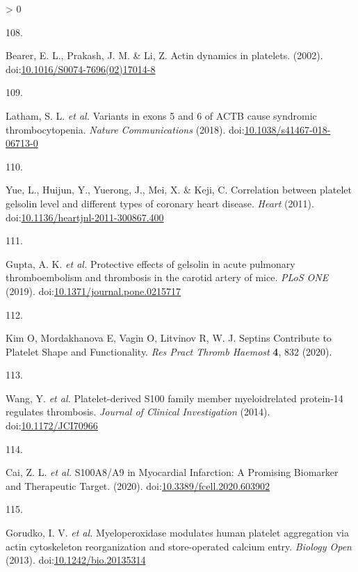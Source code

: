 \documentclass[11pt,twoside]{bristolthesis}
\newlength{\cslhangindent}
\newlength{\csllabelwidth}
\newenvironment{CSLReferences}[2] %
 {%
  \setlength{\parindent}{0pt}
  \ifodd #1 \everypar{\setlength{\hangindent}{\cslhangindent}}\ignorespaces\fi
  \ifnum #2 > 0
  \setlength{\parskip}{#2\baselineskip}
  \fi
 }%
 {}
\newcommand{\CSLLeftMargin}[1]{\parbox[t]{\csllabelwidth}{#1}}
\newcommand{\CSLRightInline}[1]{\parbox[t]{\linewidth - \csllabelwidth}{#1}\break}
\begin{document}
\begin{CSLReferences}{0}{0}
\leavevmode\hypertarget{ref-Bearer2002}{}%
\CSLLeftMargin{108. }
\CSLRightInline{Bearer, E. L., Prakash, J. M. \& Li, Z. {Actin dynamics in platelets}. (2002). doi:\href{https://doi.org/10.1016/S0074-7696(02)17014-8}{10.1016/S0074-7696(02)17014-8}}

\leavevmode\hypertarget{ref-Latham2018}{}%
\CSLLeftMargin{109. }
\CSLRightInline{Latham, S. L. \emph{et al.} {Variants in exons 5 and 6 of ACTB cause syndromic thrombocytopenia}. \emph{Nature Communications} (2018). doi:\href{https://doi.org/10.1038/s41467-018-06713-0}{10.1038/s41467-018-06713-0}}

\leavevmode\hypertarget{ref-Yue2011}{}%
\CSLLeftMargin{110. }
\CSLRightInline{Yue, L., Huijun, Y., Yuerong, J., Mei, X. \& Keji, C. {Correlation between platelet gelsolin level and different types of coronary heart disease}. \emph{Heart} (2011). doi:\href{https://doi.org/10.1136/heartjnl-2011-300867.400}{10.1136/heartjnl-2011-300867.400}}

\leavevmode\hypertarget{ref-Gupta2019}{}%
\CSLLeftMargin{111. }
\CSLRightInline{Gupta, A. K. \emph{et al.} {Protective effects of gelsolin in acute pulmonary thromboembolism and thrombosis in the carotid artery of mice}. \emph{PLoS ONE} (2019). doi:\href{https://doi.org/10.1371/journal.pone.0215717}{10.1371/journal.pone.0215717}}

\leavevmode\hypertarget{ref-Kim2020}{}%
\CSLLeftMargin{112. }
\CSLRightInline{Kim O, Mordakhanova E, Vagin O, Litvinov R, W. J. {Septins Contribute to Platelet Shape and Functionality}. \emph{Res Pract Thromb Haemost} \textbf{4}, 832 (2020).}

\leavevmode\hypertarget{ref-Wang2014a}{}%
\CSLLeftMargin{113. }
\CSLRightInline{Wang, Y. \emph{et al.} {Platelet-derived S100 family member myeloidrelated protein-14 regulates thrombosis}. \emph{Journal of Clinical Investigation} (2014). doi:\href{https://doi.org/10.1172/JCI70966}{10.1172/JCI70966}}

\leavevmode\hypertarget{ref-Cai2020}{}%
\CSLLeftMargin{114. }
\CSLRightInline{Cai, Z. L. \emph{et al.} {S100A8/A9 in Myocardial Infarction: A Promising Biomarker and Therapeutic Target}. (2020). doi:\href{https://doi.org/10.3389/fcell.2020.603902}{10.3389/fcell.2020.603902}}

\leavevmode\hypertarget{ref-Gorudko2013}{}%
\CSLLeftMargin{115. }
\CSLRightInline{Gorudko, I. V. \emph{et al.} {Myeloperoxidase modulates human platelet aggregation via actin cytoskeleton reorganization and store-operated calcium entry}. \emph{Biology Open} (2013). doi:\href{https://doi.org/10.1242/bio.20135314}{10.1242/bio.20135314}}


\end{CSLReferences}
\end{document}

